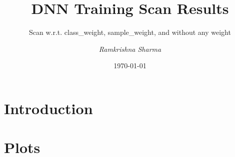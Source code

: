 \documentclass[slidestop,compress,mathserif,aspectratio=169]{beamer}
\title[Priliminary Plots]{DNN Training Scan Results}
\subtitle{Scan w.r.t. class\_weight, sample\_weight, and without any weight}
\date[\today]{\today}
\author[Ram krishna Sharma]{
		\emph{Ramkrishna Sharma}\inst{1}
		}
\institute[Beijing,China]{
			\inst{1}IHEP, Beijing
		}
\begin{document}

%
%
{
\begin{frame}
\titlepage
\end{frame}
}

\section{Introduction}

\section{Plots}
\end{document}
